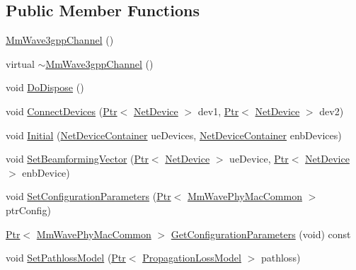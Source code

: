 \subsection*{Public Member Functions}
\begin{DoxyCompactItemize}
\item 
\hyperlink{classns3_1_1MmWave3gppChannel_afdbee5420922706062627b16b492fe14}{Mm\+Wave3gpp\+Channel} ()
\item 
virtual \hyperlink{classns3_1_1MmWave3gppChannel_a8eabd72db5f2efe7955d07bfa01dbeed}{$\sim$\+Mm\+Wave3gpp\+Channel} ()
\item 
void \hyperlink{classns3_1_1MmWave3gppChannel_a04d461e913a8f5a00854c3bc9db6dce3}{Do\+Dispose} ()
\item 
void \hyperlink{classns3_1_1MmWave3gppChannel_ad2a4b9738d3630c1363eee2f7a34f68e}{Connect\+Devices} (\hyperlink{classns3_1_1Ptr}{Ptr}$<$ \hyperlink{classns3_1_1NetDevice}{Net\+Device} $>$ dev1, \hyperlink{classns3_1_1Ptr}{Ptr}$<$ \hyperlink{classns3_1_1NetDevice}{Net\+Device} $>$ dev2)
\item 
void \hyperlink{classns3_1_1MmWave3gppChannel_ad51205a072737028520bb1bf7d255050}{Initial} (\hyperlink{classns3_1_1NetDeviceContainer}{Net\+Device\+Container} ue\+Devices, \hyperlink{classns3_1_1NetDeviceContainer}{Net\+Device\+Container} enb\+Devices)
\item 
void \hyperlink{classns3_1_1MmWave3gppChannel_a47452fa275fee0e056f646379ccc9288}{Set\+Beamforming\+Vector} (\hyperlink{classns3_1_1Ptr}{Ptr}$<$ \hyperlink{classns3_1_1NetDevice}{Net\+Device} $>$ ue\+Device, \hyperlink{classns3_1_1Ptr}{Ptr}$<$ \hyperlink{classns3_1_1NetDevice}{Net\+Device} $>$ enb\+Device)
\item 
void \hyperlink{classns3_1_1MmWave3gppChannel_a18aeca33b5a09843d342fc3abb5abf68}{Set\+Configuration\+Parameters} (\hyperlink{classns3_1_1Ptr}{Ptr}$<$ \hyperlink{classns3_1_1MmWavePhyMacCommon}{Mm\+Wave\+Phy\+Mac\+Common} $>$ ptr\+Config)
\item 
\hyperlink{classns3_1_1Ptr}{Ptr}$<$ \hyperlink{classns3_1_1MmWavePhyMacCommon}{Mm\+Wave\+Phy\+Mac\+Common} $>$ \hyperlink{classns3_1_1MmWave3gppChannel_a8ba423399c2109b66c4d63b201ae5794}{Get\+Configuration\+Parameters} (void) const 
\item 
void \hyperlink{classns3_1_1MmWave3gppChannel_a01b18ad10ea2cf6acd7ee23d53eba3fc}{Set\+Pathloss\+Model} (\hyperlink{classns3_1_1Ptr}{Ptr}$<$ \hyperlink{classns3_1_1PropagationLossModel}{Propagation\+Loss\+Model} $>$ pathloss)
\end{DoxyCompactItemize}

